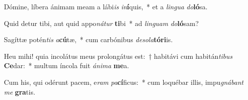 \item Dómine, líbera ánimam meam a lábi\textit{is} \textit{in}\textbf{í}quis,~* et a \textit{lin}\textit{gua} \textit{do}\textbf{ló}sa.
\item Quid detur tibi, aut quid appo\textit{ná}\textit{tur} \textbf{ti}bi~* ad \textit{lin}\textit{guam} \textit{do}\textbf{ló}sam?
\item Sagíttæ potén\textit{tis} \textit{a}\textbf{cú}tæ,~* cum carbónibus \textit{de}\textit{so}\textit{la}\textbf{tó}\textbf{ri}is.
\item Heu mihi! quia incolátus meus prolongátus est:~† habitávi cum habitán\textit{ti}\textit{bus} \textbf{Ce}dar:~* multum íncola fuit \textit{á}\textit{ni}\textit{ma} \textbf{me}a.
\item Cum his, qui odérunt pacem, e\textit{ram} \textit{pa}\textbf{cí}ficus:~* cum loquébar illis, impu\textit{gná}\textit{bant} \textit{me} \textbf{gra}tis.
